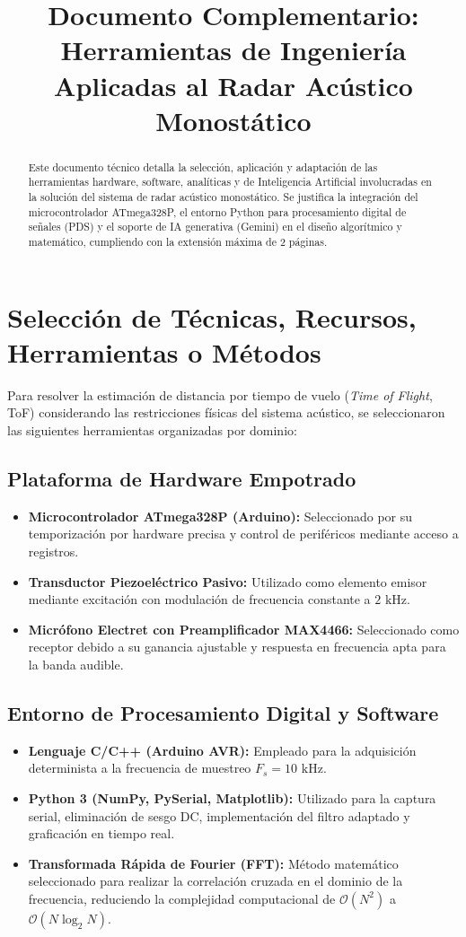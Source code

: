 \documentclass[conference]{IEEEtran}
\title{Documento Complementario: Herramientas de Ingeniería Aplicadas al Radar Acústico Monostático}
\author{\IEEEauthorblockN{José Andrés Solano Mora}
\IEEEauthorblockA{\textit{Escuela de Ingeniería en Computadores} \\
\textit{Tecnológico de Costa Rica}\\
Cartago, Costa Rica}
}
\begin{document}
\maketitle

\begin{abstract}
Este documento técnico detalla la selección, aplicación y adaptación de las herramientas hardware, software, analíticas y de Inteligencia Artificial involucradas en la solución del sistema de radar acústico monostático. Se justifica la integración del microcontrolador ATmega328P, el entorno Python para procesamiento digital de señales (PDS) y el soporte de IA generativa (Gemini) en el diseño algorítmico y matemático, cumpliendo con la extensión máxima de 2 páginas.
\end{abstract}

\section{Selección de Técnicas, Recursos, Herramientas o Métodos}
Para resolver la estimación de distancia por tiempo de vuelo (\textit{Time of Flight}, ToF) considerando las restricciones físicas del sistema acústico, se seleccionaron las siguientes herramientas organizadas por dominio:

\subsection{Plataforma de Hardware Empotrado}
\begin{itemize}
    \item \textbf{Microcontrolador ATmega328P (Arduino):} Seleccionado por su temporización por hardware precisa y control de periféricos mediante acceso a registros.
    \item \textbf{Transductor Piezoeléctrico Pasivo:} Utilizado como elemento emisor mediante excitación con modulación de frecuencia constante a $2\text{ kHz}$.
    \item \textbf{Micrófono Electret con Preamplificador MAX4466:} Seleccionado como receptor debido a su ganancia ajustable y respuesta en frecuencia apta para la banda audible.
\end{itemize}

\subsection{Entorno de Procesamiento Digital y Software}
\begin{itemize}
    \item \textbf{Lenguaje C/C++ (Arduino AVR):} Empleado para la adquisición determinista a la frecuencia de muestreo $F_s = 10\text{ kHz}$.
    \item \textbf{Python 3 (NumPy, PySerial, Matplotlib):} Utilizado para la captura serial, eliminación de sesgo DC, implementación del filtro adaptado y graficación en tiempo real.
    \item \textbf{Transformada Rápida de Fourier (FFT):} Método matemático seleccionado para realizar la correlación cruzada en el dominio de la frecuencia, reduciendo la complejidad computacional de $\mathcal{O}(N^2)$ a $\mathcal{O}(N \log_2 N)$.
\end{itemize}
\end{document}
